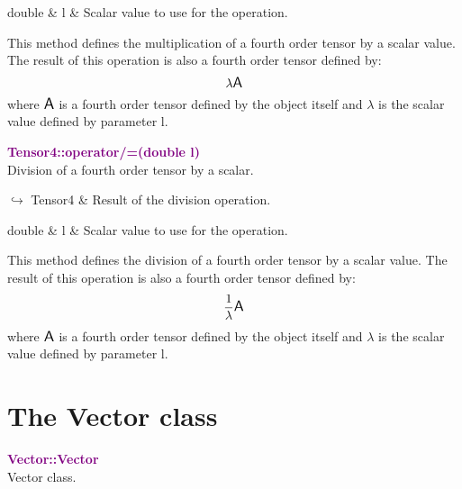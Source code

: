 \begin{tcolorbox}[width=\textwidth,myArgs,tabularx={ll|R}]
double & l & Scalar value to use for the operation.
\end{tcolorbox}

This method defines the multiplication of a fourth order tensor by a scalar value.
The result of this operation is also a fourth order tensor defined by:
\begin{equation*}
\lambda \mbox{\large\ensuremath{\mathsf{A}}}
\end{equation*}
where $\mbox{\large\ensuremath{\mathsf{A}}}$ is a fourth order tensor defined by the object itself and $\lambda$ is the scalar value defined by parameter l.

\textcolor{purple}{\textbf{Tensor4::operator/=(double l)}}\label{Tensor4::operator/=(double l)}\\
Division of a fourth order tensor by a scalar.\vspace*{-0.5em}
\begin{tcolorbox}[grow to left by=-1cm, width=\textwidth-1cm,myArgs,tabularx={l|R}]
$\hookrightarrow$ Tensor4 & Result of the division operation.
\end{tcolorbox}

\begin{tcolorbox}[width=\textwidth,myArgs,tabularx={ll|R}]
double & l & Scalar value to use for the operation.
\end{tcolorbox}

This method defines the division of a fourth order tensor by a scalar value.
The result of this operation is also a fourth order tensor defined by:
\begin{equation*}
\frac{1}{\lambda} \mbox{\large\ensuremath{\mathsf{A}}}
\end{equation*}
where $\mbox{\large\ensuremath{\mathsf{A}}}$ is a fourth order tensor defined by the object itself and $\lambda$ is the scalar value defined by parameter l.

\section{The Vector class}

\textcolor{purple}{\textbf{Vector::Vector}}\label{Vector::Vector}\\
Vector class.

